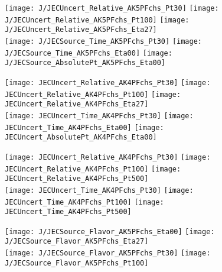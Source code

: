 \documentclass[landscape,10pt]{beamer} %
\begin{document}
{\newpage

\begin{figure}[p]
\centering
  \texttt{[image: J/JECUncert\_Relative\_AK5PFchs\_Pt30]}
  \texttt{[image: J/JECUncert\_Relative\_AK5PFchs\_Pt100]}
  \texttt{[image: J/JECUncert\_Relative\_AK5PFchs\_Eta27]}\\
  \texttt{[image: J/JECSource\_Time\_AK5PFchs\_Pt30]}
  \texttt{[image: J/JECSource\_Time\_AK5PFchs\_Eta00]}
  \texttt{[image: J/JECSource\_AbsolutePt\_AK5PFchs\_Eta00]}
\end{figure}

\newpage 

\begin{figure}[p]
\centering
  \texttt{[image: JECUncert\_Relative\_AK4PFchs\_Pt30]}
  \texttt{[image: JECUncert\_Relative\_AK4PFchs\_Pt100]}
  \texttt{[image: JECUncert\_Relative\_AK4PFchs\_Eta27]}\\
  \texttt{[image: JECUncert\_Time\_AK4PFchs\_Pt30]}
  \texttt{[image: JECUncert\_Time\_AK4PFchs\_Eta00]}
  \texttt{[image: JECUncert\_AbsolutePt\_AK4PFchs\_Eta00]}
\end{figure}

\newpage

\begin{figure}[p]
\centering
  \texttt{[image: JECUncert\_Relative\_AK4PFchs\_Pt30]}
  \texttt{[image: JECUncert\_Relative\_AK4PFchs\_Pt100]}
  \texttt{[image: JECUncert\_Relative\_AK4PFchs\_Pt500]}\\
  \texttt{[image: JECUncert\_Time\_AK4PFchs\_Pt30]}
  \texttt{[image: JECUncert\_Time\_AK4PFchs\_Pt100]}
  \texttt{[image: JECUncert\_Time\_AK4PFchs\_Pt500]}
\end{figure}

\newpage

\begin{figure}[p]
\centering
\texttt{[image: J/JECSource\_Flavor\_AK5PFchs\_Eta00]}
\texttt{[image: J/JECSource\_Flavor\_AK5PFchs\_Eta27]}\\
\texttt{[image: J/JECSource\_Flavor\_AK5PFchs\_Pt30]}
\texttt{[image: J/JECSource\_Flavor\_AK5PFchs\_Pt100]}
\end{figure}

}
\end{document}
